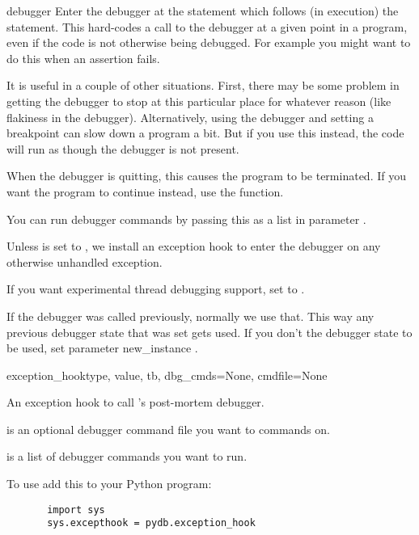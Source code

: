 \begin{funcdesc}{debugger}{}\label{debugger}
Enter the debugger at the statement which follows (in execution) the
 statement. This hard-codes a call to the debugger
at a given point in a program, even if the code is not otherwise being
debugged. For example you might want to do this when an assertion
fails.

It is useful in a couple of other situations. First, there may be some
problem in getting the debugger to stop at this particular place for
whatever reason (like flakiness in the debugger). Alternatively, using
the debugger and setting a breakpoint can slow down a program a
bit. But if you use this instead, the code will run as though the
debugger is not present.

When the debugger is quitting, this causes the program to be
terminated. If you want the program to continue instead, use the
 function.

You can run debugger commands by passing this as a list in parameter
.  

Unless  is set to , we install an
exception hook to enter the debugger on any otherwise unhandled
exception.

If you want experimental thread debugging support, set
 to .

If the debugger was called previously, normally we use that. This way
any previous debugger state that was set gets used. If you don't the
debugger state to be used, set parameter new_instance .
\end{funcdesc}

\begin{funcdesc}{exception_hook}{type, value, tb, dbg_cmds=None,
    cmdfile=None}

An exception hook to call 's post-mortem debugger.

 is an optional debugger command file you want to 
 commands on.

 is a list of debugger commands you want to run.

To use add this to your Python program:
\begin{verbatim}
       import sys
       sys.excepthook = pydb.exception_hook
\end{verbatim}
\end{funcdesc}

